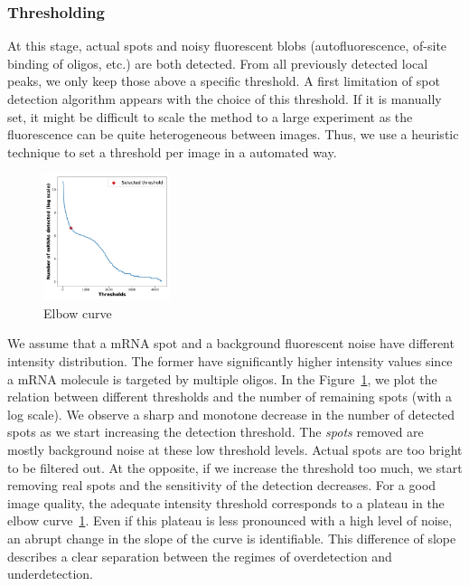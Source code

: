 
\subsubsection{Thresholding}

At this stage, actual spots and noisy fluorescent blobs (autofluorescence, of-site binding of oligos, etc.) are both detected.
From all previously detected local peaks, we only keep those above a specific threshold.
A first limitation of spot detection algorithm appears with the choice of this threshold.
If it is manually set, it might be difficult to scale the method to a large experiment as the fluorescence can be quite heterogeneous between images.
Thus, we use a heuristic technique to set a threshold per image in a automated way.

\begin{figure}
	\begin{center}
		\includegraphics[width=0.33\textwidth]{figures/chapter2/elbow_curve_real}
	\caption{Elbow curve}
	\label{fig:elbow_detection}
	\end{center}
\end{figure}

We assume that a \ac{mRNA} spot and a background fluorescent noise have different intensity distribution.
The former have significantly higher intensity values since a \ac{mRNA} molecule is targeted by multiple oligos.
In the Figure~\ref{fig:elbow_detection}, we plot the relation between different thresholds and the number of remaining spots (with a log scale).
We observe a sharp and monotone decrease in the number of detected spots as we start increasing the detection threshold.
The \emph{spots} removed are mostly background noise at these low threshold levels.
Actual spots are too bright to be filtered out.
At the opposite, if we increase the threshold too much, we start removing real spots and the sensitivity of the detection decreases.
For a good image quality, the adequate intensity threshold corresponds to a plateau in the elbow curve~\ref{fig:elbow_detection}.
Even if this plateau is less pronounced with a high level of noise, an abrupt change in the slope of the curve is identifiable.
This difference of slope describes a clear separation between the regimes of overdetection and underdetection.

